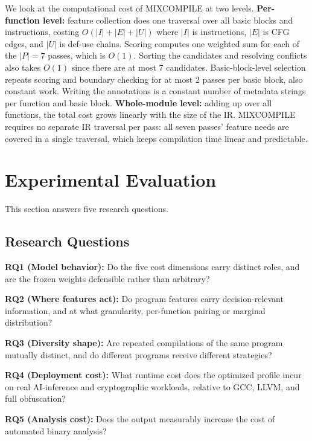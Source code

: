 \documentclass[5p,times,authoryear]{elsarticle}
\theoremstyle{plain}
\theoremstyle{definition}
\theoremstyle{remark}
\begin{document}
We look at the computational cost of MIXCOMPILE at two levels.
\textbf{Per-function level:} feature collection does one traversal over all basic
blocks and instructions, costing $O(|I| + |E| + |U|)$ where $|I|$ is instructions,
$|E|$ is CFG edges, and $|U|$ is def-use chains. Scoring computes one weighted sum
for each of the $|P| = 7$ passes, which is $O(1)$. Sorting the candidates and
resolving conflicts also takes $O(1)$ since there are at most 7 candidates.
Basic-block-level selection repeats scoring and boundary checking for at most 2
passes per basic block, also constant work. Writing the annotations is a constant
number of metadata strings per function and basic block.
\textbf{Whole-module level:} adding up over all functions, the total cost grows
linearly with the size of the IR. MIXCOMPILE requires no separate IR traversal
per pass: all seven passes' feature needs are covered in a single traversal,
which keeps compilation time linear and predictable.

\section{Experimental Evaluation}

This section answers five research questions.

\subsection{Research Questions}

\textbf{RQ1 (Model behavior):} Do the five cost dimensions carry distinct roles, and
are the frozen weights defensible rather than arbitrary?

\textbf{RQ2 (Where features act):} Do program features carry decision-relevant
information, and at what granularity, per-function pairing or marginal distribution?

\textbf{RQ3 (Diversity shape):} Are repeated compilations of the same program mutually
distinct, and do different programs receive different strategies?

\textbf{RQ4 (Deployment cost):} What runtime cost does the optimized profile incur on
real AI-inference and cryptographic workloads, relative to GCC, LLVM, and full
obfuscation?

\textbf{RQ5 (Analysis cost):} Does the output measurably increase the cost of
automated binary analysis?
\end{document}
